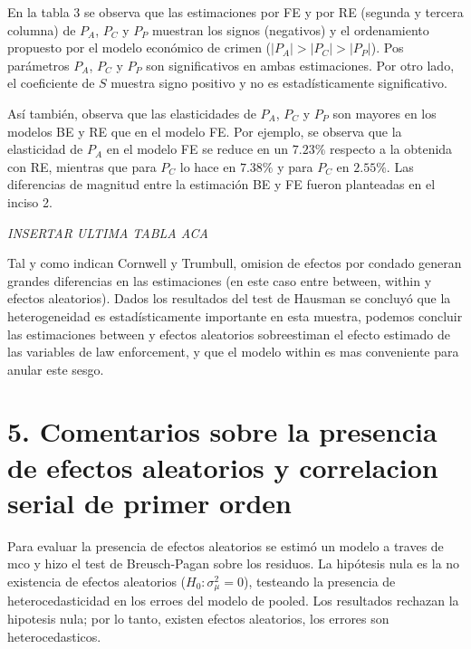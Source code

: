 \documentclass[
]{article}
\begin{document}
En la tabla 3 se observa que las estimaciones por FE y por RE (segunda y
tercera columna) de \(P_A\), \(P_C\) y \(P_P\) muestran los signos
(negativos) y el ordenamiento propuesto por el modelo económico de
crimen (\(|P_A|>|P_C|>|P_P|\)). Pos parámetros \(P_A\), \(P_C\) y
\(P_P\) son significativos en ambas estimaciones. Por otro lado, el
coeficiente de \(S\) muestra signo positivo y no es estadísticamente
significativo.

Así también, observa que las elasticidades de \(P_A\), \(P_C\) y \(P_P\)
son mayores en los modelos BE y RE que en el modelo FE. Por ejemplo, se
observa que la elasticidad de \(P_A\) en el modelo FE se reduce en un
\(7.23\%\) respecto a la obtenida con RE, mientras que para \(P_C\) lo
hace en \(7.38\%\) y para \(P_C\) en \(2.55\%\). Las diferencias de
magnitud entre la estimación BE y FE fueron planteadas en el inciso 2.

\emph{INSERTAR ULTIMA TABLA ACA}

Tal y como indican Cornwell y Trumbull, omision de efectos por condado
generan grandes diferencias en las estimaciones (en este caso entre
between, within y efectos aleatorios). Dados los resultados del test de
Hausman se concluyó que la heterogeneidad es estadísticamente importante
en esta muestra, podemos concluir las estimaciones between y efectos
aleatorios sobreestiman el efecto estimado de las variables de law
enforcement, y que el modelo within es mas conveniente para anular este
sesgo.

\hypertarget{comentarios-sobre-la-presencia-de-efectos-aleatorios-y-correlacion-serial-de-primer-orden}{%
\section{5. Comentarios sobre la presencia de efectos aleatorios y
correlacion serial de primer
orden}\label{comentarios-sobre-la-presencia-de-efectos-aleatorios-y-correlacion-serial-de-primer-orden}}

Para evaluar la presencia de efectos aleatorios se estimó un modelo a
traves de mco y hizo el test de Breusch-Pagan sobre los residuos. La
hipótesis nula es la no existencia de efectos aleatorios
(\(H_0: \sigma^2_\mu=0\)), testeando la presencia de heterocedasticidad
en los erroes del modelo de pooled. Los resultados rechazan la hipotesis
nula; por lo tanto, existen efectos aleatorios, los errores son
heterocedasticos.
\end{document}
